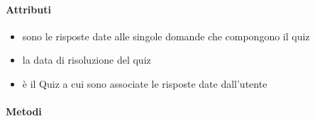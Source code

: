 \paragraph{Attributi}
\begin{itemize}
\item {}
\newline
sono le risposte date alle singole domande che compongono il quiz
\item {}
\newline
la data di risoluzione del quiz
\item {}
\newline
è il Quiz a cui sono associate le risposte date dall'utente
\end{itemize}
\paragraph{Metodi}

